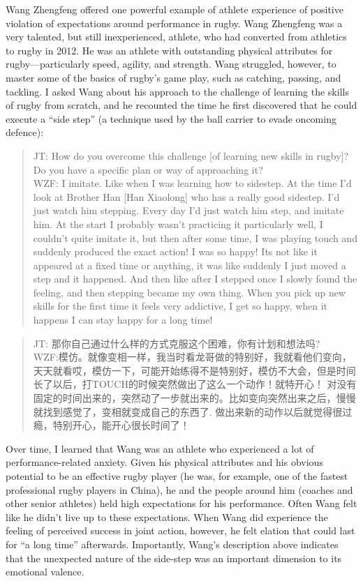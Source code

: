 \begin{CJK}{UTF8}{gbsn}
Wang Zhengfeng offered one powerful example of athlete experience of positive violation of expectations around performance in rugby.  Wang Zhengfeng was a very talented, but still inexperienced, athlete, who had converted from athletics to rugby in 2012.  He was an athlete with outstanding physical attributes for rugby---particularly speed, agility, and strength.  Wang struggled, however, to master some of the basics of rugby's game play, such as catching, passing, and tackling. I asked Wang about his approach to the challenge of learning the skills of rugby from scratch, and he recounted the time he first discovered that he could execute a ``side step'' (a technique used by the ball carrier to evade oncoming defence):

    \begin{quote}
      JT: How do you overcome this challenge [of learning new skills in rugby]? Do you have a specific plan or way of approaching it? \\
      WZF: I imitate.  Like when I was learning how to sidestep. At the time I'd look at Brother Han [Han Xiaolong] who has a really good sidestep. I'd just watch him stepping.  Every day I'd just watch him step, and imitate him.  At the start I probably wasn't practicing it particularly well, I couldn't quite imitate it, but then after some time, I was playing touch and suddenly produced the exact action! I was so happy! Its not like it appeared at a fixed time or anything, it was like suddenly I just moved a step and it happened. And then like after I stepped once I slowly found the feeling, and then stepping became my own thing.  When you pick up new skills for the first time it feels very addictive, I get so happy, when it happens I can stay happy for a long time!
    \end{quote}

    \begin{quote}
      JT: 那你自己通过什么样的方式克服这个困难，你有计划和想法吗? \\
      WZF:模仿。就像变相一样，我当时看龙哥做的特别好，我就看他们变向，天天就看哎，模仿一下，可能开始练得不是特别好，模仿不大会，但是时间长了以后，打TOUCH的时候突然做出了这么一个动作！就特开心！ 对没有固定的时间出来的，突然动了一步就出来的。比如变向突然出来之后，慢慢就找到感觉了，变相就变成自己的东西了. 做出来新的动作以后就觉得很过瘾，特别开心，能开心很长时间了！
    \end{quote}

Over time, I learned that Wang was an athlete who experienced a lot of performance-related anxiety.  Given his physical attributes and his obvious potential to be an effective rugby player (he was, for example, one of the fastest professional rugby players in China), he and the people around him (coaches and other senior athletes) held high expectations for his performance.  Often Wang felt like he didn't live up to these expectations.  When Wang did experience the feeling of perceived success in joint action, however, he felt elation that could last for ``a long time'' afterwards.  Importantly, Wang's description above indicates that the unexpected nature of the side-step was an important dimension to its emotional valence.


\end{CJK}
